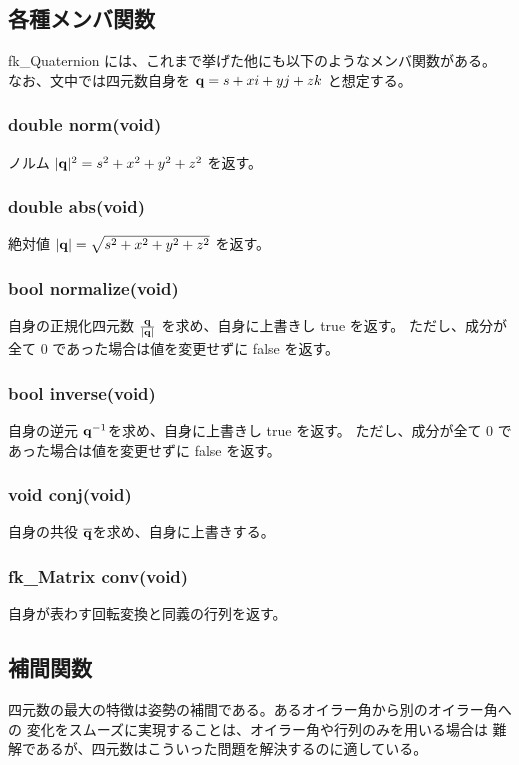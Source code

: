 \subsection{各種メンバ関数}
fk\_Quaternion には、これまで挙げた他にも以下のようなメンバ関数がある。
なお、文中では四元数自身を \(\mathbf{q} = s + xi + yj + zk\) と想定する。

\subsubsection*{double norm(void)}
ノルム \(|\mathbf{q}|^2 = s^2 + x^2 + y^2 + z^2\) を返す。

\subsubsection*{double abs(void)}
絶対値 \(|\mathbf{q}| = \sqrt{s^2 + x^2 + y^2 + z^2}\) を返す。

\subsubsection*{bool normalize(void)}
自身の正規化四元数 \(\frac{\mathbf{q}}{|\mathbf{q}|}\) を求め、自身に上書きし true を返す。
ただし、成分が全て 0 であった場合は値を変更せずに false を返す。

\subsubsection*{bool inverse(void)}
自身の逆元 \(\mathbf{q}^{-1}\)を求め、自身に上書きし true を返す。
ただし、成分が全て 0 であった場合は値を変更せずに false を返す。

\subsubsection*{void conj(void)}
自身の共役 \(\overline{\mathbf{q}}\)を求め、自身に上書きする。

\subsubsection*{fk\_Matrix conv(void)}
自身が表わす回転変換と同義の行列を返す。

\subsection{補間関数}
四元数の最大の特徴は姿勢の補間である。あるオイラー角から別のオイラー角への
変化をスムーズに実現することは、オイラー角や行列のみを用いる場合は
難解であるが、四元数はこういった問題を解決するのに適している。

